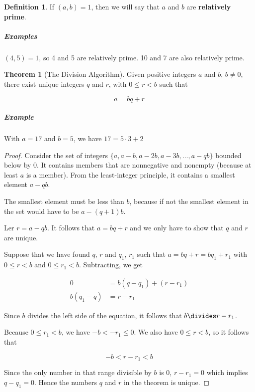 \documentclass{article}
\theoremstyle{definition} %
\newtheorem{theorem}{Theorem}[section] %
\theoremstyle{definition}
\theoremstyle{definition}
\theoremstyle{definition}
\newtheorem{definition}{Definition}[section]
\begin{document}
  \begin{definition}
    If $(a, b) = 1$, then we will say that $a$ and $b$ are \textbf{relatively prime}.
  \end{definition}
  
  \subparagraph{Examples} $(4, 5) = 1$, so 4 and 5 are relatively prime. 10 and 7 are also relatively prime.
  
  \begin{theorem}[The Division Algorithm]
    \label{th:division_algorithm} Given positive integers $a$ and $b$, $b \neq 0$, there exist unique integers
    $q$ and $r$, with $0 \leq r < b$ such that
    
    \begin{equation*}
      a = bq + r
    \end{equation*}
  \end{theorem}
  
  \subparagraph{Example} With $a = 17$ and $b = 5$, we have $17 = 5 \cdot 3 + 2$
  
  \begin{proof}
    Consider the set of integers $\{a, a - b, a - 2b, a - 3b, \dots, a - qb\}$ bounded below by 0.
    It contains members that are nonnegative and nonempty (because at least $a$ is a member).
    From the least-integer principle, it contains a smallest element $a - qb$.
    
    The smallest element must be less than $b$, because if not the smallest element in the set would have
    to be $a - (q + 1)b$.
    
    Ler $r = a - qb$. It follows that $a = bq + r$ and we only have to show that $q$ and $r$ are unique.
    
    Suppose that we have found $q$, $r$ and $q_1$, $r_1$ such that $a = bq + r = bq_1 + r_1$ with
    $0 \leq r < b$ and $0 \leq r_1 < b$. Subtracting, we get
    
    \begin{align*}
      0 &= b(q - q_1) + (r - r_1) \\
      b(q_1 - q) &= r - r_1
    \end{align*}
    
    Since $b$ divides the left side of the equation, it follows that $b \divides r - r_1$.
    
    Because $0 \leq r_1 < b$, we have $-b < -r_1 \leq 0$. We also have $0 \leq r < b$, so it follows that
    
    \begin{equation*}
      -b < r - r_1 < b
    \end{equation*}
    
    Since the only number in that range divisible by $b$ is 0, $r - r_1 = 0$ which implies $q - q_1 = 0$.
    Hence the numbers $q$ and $r$ in the theorem is unique.
  \end{proof}
  
\end{document}
